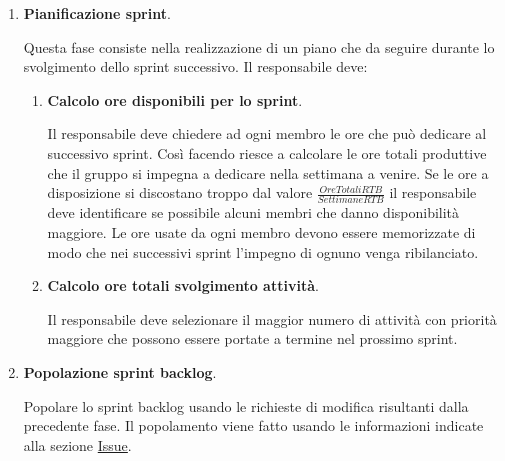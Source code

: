 \begin{enumerate}
    \item \textbf{Pianificazione sprint}.
    
    Questa fase consiste nella realizzazione di un piano che da seguire durante lo svolgimento dello sprint successivo.
    Il responsabile deve:
    \begin{enumerate}
        \item \textbf{Calcolo ore disponibili per lo sprint}.
        
        Il responsabile deve chiedere ad ogni  membro le ore che può dedicare al successivo sprint.
        Così facendo riesce a calcolare le ore totali produttive che il gruppo si impegna a dedicare nella settimana a venire.
        Se le ore a disposizione si discostano troppo dal valore $\frac{Ore Totali RTB}{Settimane RTB}$ il responsabile deve identificare se possibile alcuni membri che danno disponibilità maggiore.
        Le ore usate da ogni membro devono essere memorizzate di modo che nei successivi sprint l'impegno di ognuno venga ribilanciato.

        \item \textbf{Calcolo ore totali svolgimento attività}.
        
        Il responsabile deve selezionare il maggior numero di attività con priorità maggiore che possono essere portate a termine nel prossimo sprint.
    \end{enumerate}

    \item \textbf{Popolazione sprint backlog}.
    
    Popolare lo sprint backlog usando le richieste di modifica risultanti dalla precedente fase.
    Il popolamento viene fatto usando le informazioni indicate alla sezione \hyperref[subpar:ITS]{Issue}.
\end{enumerate}

